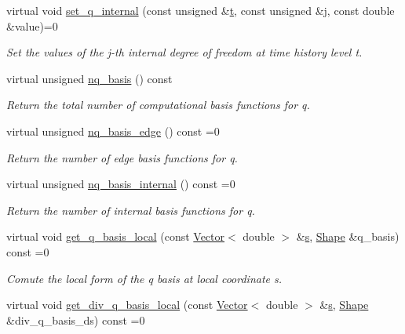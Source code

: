 \begin{DoxyCompactItemize}
virtual void \hyperlink{classoomph_1_1AxisymmetricPoroelasticityEquations_af63d9e9769c923b3f1184e80d3c62569}{set\+\_\+q\+\_\+internal} (const unsigned \&\hyperlink{cfortran_8h_af6f0bd3dc13317f895c91323c25c2b8f}{t}, const unsigned \&j, const double \&value)=0
\begin{DoxyCompactList}\small\item\em Set the values of the j-\/th internal degree of freedom at time history level t. \end{DoxyCompactList}\item 
virtual unsigned \hyperlink{classoomph_1_1AxisymmetricPoroelasticityEquations_a8d51be2febf03886ff0b2217ae895b67}{nq\+\_\+basis} () const
\begin{DoxyCompactList}\small\item\em Return the total number of computational basis functions for q. \end{DoxyCompactList}\item 
virtual unsigned \hyperlink{classoomph_1_1AxisymmetricPoroelasticityEquations_aa5141d30c6dc0d4209ae043ddcea3d2e}{nq\+\_\+basis\+\_\+edge} () const =0
\begin{DoxyCompactList}\small\item\em Return the number of edge basis functions for q. \end{DoxyCompactList}\item 
virtual unsigned \hyperlink{classoomph_1_1AxisymmetricPoroelasticityEquations_afa7d0f89a144f2031959d750f7b3ebc1}{nq\+\_\+basis\+\_\+internal} () const =0
\begin{DoxyCompactList}\small\item\em Return the number of internal basis functions for q. \end{DoxyCompactList}\item 
virtual void \hyperlink{classoomph_1_1AxisymmetricPoroelasticityEquations_afe94aaa6d3af8c997c760465b6930c27}{get\+\_\+q\+\_\+basis\+\_\+local} (const \hyperlink{classoomph_1_1Vector}{Vector}$<$ double $>$ \&\hyperlink{cfortran_8h_ab7123126e4885ef647dd9c6e3807a21c}{s}, \hyperlink{classoomph_1_1Shape}{Shape} \&q\+\_\+basis) const =0
\begin{DoxyCompactList}\small\item\em Comute the local form of the q basis at local coordinate s. \end{DoxyCompactList}\item 
virtual void \hyperlink{classoomph_1_1AxisymmetricPoroelasticityEquations_abe3e6e28eb58ae719a6180d0d57b1815}{get\+\_\+div\+\_\+q\+\_\+basis\+\_\+local} (const \hyperlink{classoomph_1_1Vector}{Vector}$<$ double $>$ \&\hyperlink{cfortran_8h_ab7123126e4885ef647dd9c6e3807a21c}{s}, \hyperlink{classoomph_1_1Shape}{Shape} \&div\+\_\+q\+\_\+basis\+\_\+ds) const =0

\end{DoxyCompactItemize}
